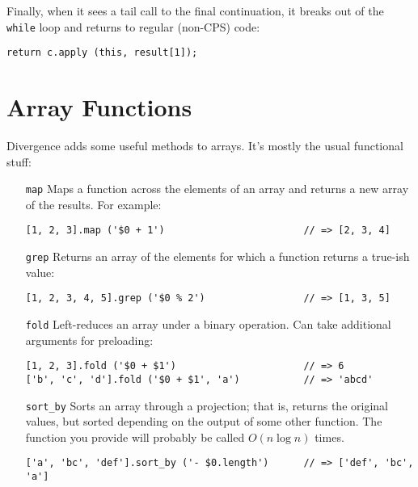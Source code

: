 \documentclass{report}
\begin{document}
      Finally, when it sees a tail call to the final continuation, it breaks out of the \verb|while| loop and returns to regular (non-CPS) code:

\begin{verbatim}
return c.apply (this, result[1]);
\end{verbatim}

\chapter {Array Functions}
    \label{sec:array-functions}
    Divergence adds some useful methods to arrays. It's mostly the usual functional stuff:

\begin{enumerate}
\item[{\tt map}]      Maps a function across the elements of an array and returns a new array of the results. For example:

\begin{verbatim}
[1, 2, 3].map ('$0 + 1')                        // => [2, 3, 4]
\end{verbatim}

\item[{\tt grep}]     Returns an array of the elements for which a function returns a true-ish value:

\begin{verbatim}
[1, 2, 3, 4, 5].grep ('$0 % 2')                 // => [1, 3, 5]
\end{verbatim}

\item[{\tt fold}]     Left-reduces an array under a binary operation. Can take additional arguments for preloading:

\begin{verbatim}
[1, 2, 3].fold ('$0 + $1')                      // => 6
['b', 'c', 'd'].fold ('$0 + $1', 'a')           // => 'abcd'
\end{verbatim}

\item[{\tt sort\_by}] Sorts an array through a projection; that is, returns the original values, but sorted depending on the output of some other function. The function you provide will
                        probably be called $O(n \log n)$ times.

\begin{verbatim}
['a', 'bc', 'def'].sort_by ('- $0.length')      // => ['def', 'bc', 'a']
\end{verbatim}


\end{enumerate}
\end{document}
